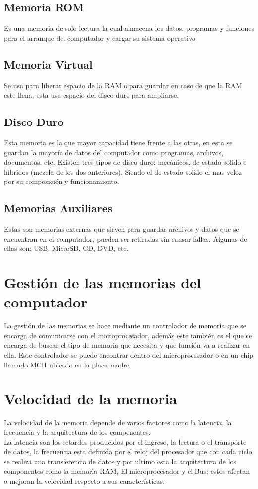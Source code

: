 \documentclass{article}
\begin{document}
	\subsection{Memoria ROM}
	Es una memoria de solo lectura la cual almacena los datos, programas y funciones para el arranque del computador y cargar su sistema operativo\cite{rom}
	
	\subsection{Memoria Virtual}
	Se usa para liberar espacio de la RAM o para guardar en caso de que la RAM este llena, esta usa espacio del disco duro para ampliarse.
	
	\subsection{Disco Duro}
	Esta memoria es la que mayor capacidad tiene frente a las otras, en esta se guardan la mayoría de datos del computador como programas, archivos, documentos, etc. Existen tres tipos de disco duro: mecánicos, de estado solido e híbridos (mezcla de los dos anteriores). Siendo el de estado solido el mas veloz por su composición y funcionamiento.
	
	\subsection{Memorias Auxiliares}
	Estas son memorias externas que sirven para guardar archivos y datos que se encuentran en el computador, pueden ser retiradas sin causar fallas. Algunas de ellas son: USB, MicroSD, CD, DVD, etc.
	
	\section{Gestión de las memorias del computador}
	La gestión de las memorias se hace mediante un controlador de memoria que se encarga de comunicarse con el microprocesador, además este también es el que se encarga de buscar el tipo de memoria que necesita y que función va a realizar en ella.
	Este controlador se puede encontrar dentro del microprocesador o en un chip llamado MCH ubicado en la placa madre.\cite{memoria}
	
	\section{Velocidad de la memoria}
	La velocidad de la memoria depende de varios factores como la latencia, la frecuencia y la arquitectura de los componentes.\\
	La latencia son los retardos producidos por el ingreso,
	la lectura o el transporte de datos, la frecuencia esta definida por el reloj del procesador que con cada ciclo se realiza una transferencia de datos y por ultimo esta la arquitectura de los componentes como la memoria RAM,
	El microprocesador y el Bus; estos afectan o mejoran la velocidad respecto a sus características.\cite{velocidad}\\
	
\end{document}

